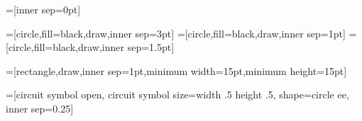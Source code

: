 
\usetikzlibrary{backgrounds,circuits,circuits.ee.IEC,shapes,fit,matrix,automata,decorations.markings}
\UseTwocells


  \tikzset{font=\footnotesize}
  =[inner sep=0pt]

=[circle,fill=black,draw,inner sep=3pt]
=[circle,fill=black,draw,inner sep=1pt]
=[circle,fill=black,draw,inner sep=1.5pt]

=[rectangle,draw,inner sep=1pt,minimum width=15pt,minimum height=15pt]
  

  =[circuit symbol open,
    circuit symbol size=width .5 height .5,
    shape=circle ee,
  inner sep=0.25\pgflinewidth]

\newcommand{\mult}[1]
{
\begin{aligned}
    \resizebox{#1}{!}{
\begin{tikzpicture}
	\begin{pgfonlayer}{nodelayer}
		\node [style=none] (0) at (1, -0) {};
		\node [style=circ] (1) at (0.125, -0) {};
		\node [style=none] (2) at (-1, 0.5) {};
		\node [style=none] (3) at (-1, -0.5) {};
	\end{pgfonlayer}
	\begin{pgfonlayer}{edgelayer}
		\draw[line width=2pt] (0.center) to (1.center);
		\draw[line width=2pt] [in=0, out=120, looseness=1.20] (1.center) to (2.center);
		\draw[line width=2pt] [in=0, out=-120, looseness=1.20] (1.center) to (3.center);
	\end{pgfonlayer}
      \end{tikzpicture}}
\end{aligned}
}

\newcommand{\unit}[1]
{
  \begin{aligned}
    \resizebox{#1}{!}{
\begin{tikzpicture}
	\begin{pgfonlayer}{nodelayer}
		\node [style=none] (0) at (1, -0) {};
		\node [style=none] (1) at (-1, -0) {};
		\node [style=circ] (2) at (0, -0) {};
	\end{pgfonlayer}
	\begin{pgfonlayer}{edgelayer}
		\draw[line width=2pt] (0.center) to (2);
	\end{pgfonlayer}
      \end{tikzpicture}}
  \end{aligned}
}

